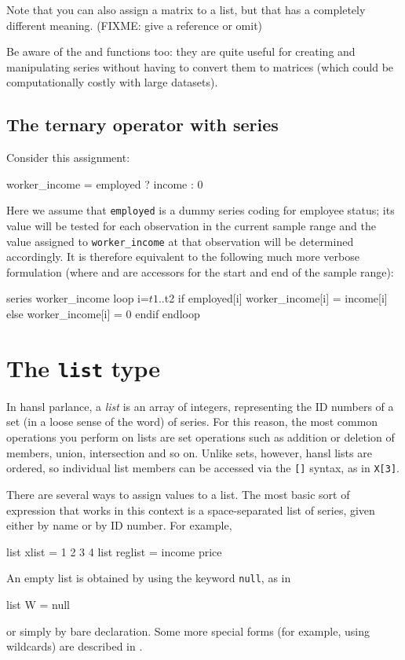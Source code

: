Note that you can also assign a matrix to a list, but that has a
completely different meaning. (FIXME: give a reference or omit)

Be aware of the  and  functions too: they are
quite useful for creating and manipulating series without having to
convert them to matrices (which could be computationally costly with
large datasets).

\subsection{The ternary operator with series}

Consider this assignment:

\begin{code}
  worker_income = employed ? income : 0
\end{code}

Here we assume that \texttt{employed} is a dummy series coding for
employee status; its value will be tested for each observation in the
current sample range and the value assigned to \texttt{worker\_income}
at that observation will be determined accordingly. It is therefore
equivalent to the following much more verbose formulation (where
 and  are accessors for the start and end of the
sample range):
\begin{code}
series worker_income
loop i=$t1..$t2
    if employed[i]
        worker_income[i] = income[i]
    else
        worker_income[i] = 0
    endif
endloop
\end{code}

\section{The \texttt{list} type}
\label{sec:lists}
 
In hansl parlance, a \textit{list} is an array of integers,
representing the ID numbers of a set (in a loose sense of the word) of
series.  For this reason, the most common operations you perform on
lists are set operations such as addition or deletion of members,
union, intersection and so on. Unlike sets, however, hansl lists are
ordered, so individual list members can be accessed via the
\texttt{[]} syntax, as in \texttt{X[3]}.

There are several ways to assign values to a list.  The most basic
sort of expression that works in this context is a space-separated
list of series, given either by name or by ID number.  For example,
\begin{code}
list xlist = 1 2 3 4
list reglist = income price 
\end{code}
An empty list is obtained by using the keyword \texttt{null}, as in
\begin{code}
list W = null  
\end{code}
or simply by bare declaration. Some more special forms (for example,
using wildcards) are described in \GUG.

